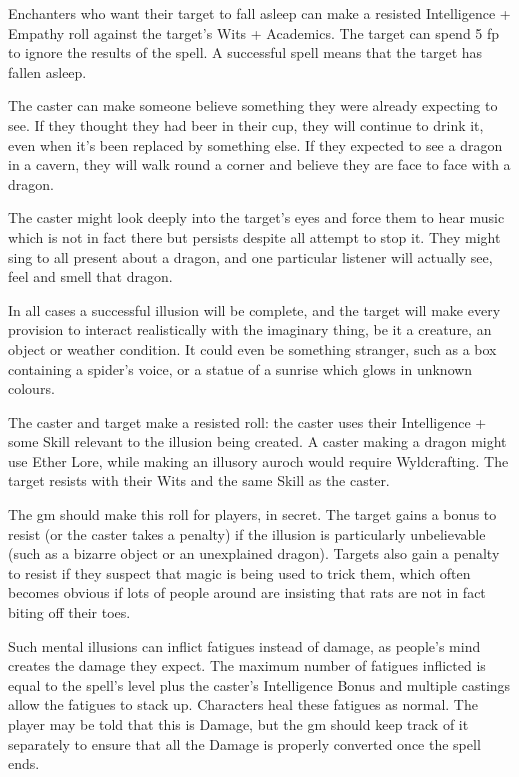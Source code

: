 \begin{multicols}{2}
\spelllevel


Enchanters who want their target to fall asleep can make a resisted Intelligence + Empathy roll against the target's Wits + Academics.
The target can spend 5 \gls{fp} to ignore the results of the spell. A successful spell means that the target has fallen asleep.


The caster can make someone believe something they were already expecting to see.
If they thought they had beer in their cup, they will continue to drink it, even when it's been replaced by something else.
If they expected to see a dragon in a cavern, they will walk round a corner and believe they are face to face with a dragon.

The caster might look deeply into the target's eyes and force them to hear music which is not in fact there but persists despite all attempt to stop it. They might sing to all present about a dragon, and one particular listener will actually see, feel and smell that dragon.

In all cases a successful illusion will be complete, and the target will make every provision to interact realistically with the imaginary thing, be it a creature, an object or weather condition. It could even be something stranger, such as a box containing a spider's voice, or a statue of a sunrise which glows in unknown colours.

The caster and target make a resisted roll: the caster uses their Intelligence + some Skill relevant to the illusion being created.
A caster making a dragon might use Ether Lore, while making an illusory auroch would require Wyldcrafting.
The target resists with their Wits and the same Skill as the caster.

The \gls{gm} should make this roll for players, in secret. The target gains a bonus to resist (or the caster takes a penalty) if the illusion is particularly unbelievable (such as a bizarre object or an unexplained dragon). Targets also gain a penalty to resist if they suspect that magic is being used to trick them, which often becomes obvious if lots of people around are insisting that rats are not in fact biting off their toes.

Such mental illusions can inflict \glspl{fatigue} instead of damage, as people's mind creates the damage they expect.
The maximum number of \glspl{fatigue} inflicted is equal to the spell's level plus the caster's Intelligence Bonus and multiple castings allow the \glspl{fatigue} to stack up.
Characters heal these \glspl{fatigue} as normal.
The player may be told that this is Damage, but the \gls{gm} should keep track of it separately to ensure that all the Damage is properly converted once the spell ends.


\end{multicols}
